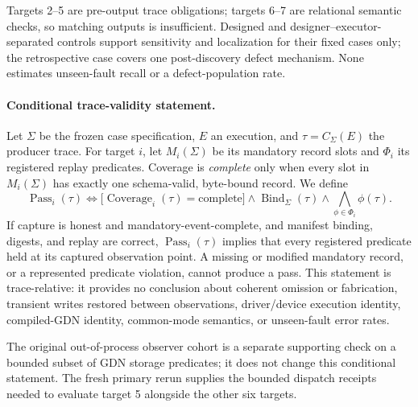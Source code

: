 \documentclass{article}
\begin{document}
Targets 2--5 are pre-output trace obligations; targets 6--7 are relational
semantic checks, so matching outputs is insufficient.  Designed and
designer--executor-separated controls support sensitivity and localization for
their fixed cases only; the retrospective case covers one post-discovery defect
mechanism.  None estimates unseen-fault recall or a defect-population rate.

\paragraph{Conditional trace-validity statement.}
Let $\Sigma$ be the frozen case specification, $E$ an execution, and
$\tau=C_{\Sigma}(E)$ the producer trace.  For target $i$, let
$M_i(\Sigma)$ be its mandatory record slots and $\Phi_i$ its registered replay
predicates.  Coverage is \emph{complete} only when every slot in
$M_i(\Sigma)$ has exactly one schema-valid, byte-bound record.  We define
\begin{equation}
  \operatorname{Pass}_i(\tau) \Longleftrightarrow
  \bigl[\operatorname{Coverage}_i(\tau)=\mathrm{complete}\bigr]
  \wedge \operatorname{Bind}_{\Sigma}(\tau)
  \wedge \bigwedge_{\phi\in\Phi_i}\phi(\tau).
\end{equation}
If capture is honest and mandatory-event-complete, and manifest binding,
digests, and replay are correct, $\operatorname{Pass}_i(\tau)$ implies that
every registered predicate held at its captured observation point.  A missing
or modified mandatory record, or a represented predicate violation, cannot
produce a pass.  This statement is trace-relative: it provides no conclusion
about coherent omission or fabrication, transient writes restored between
observations, driver/device execution identity, compiled-GDN identity,
common-mode semantics, or unseen-fault error rates.

The original out-of-process observer cohort is a separate supporting check on a
bounded subset of GDN storage predicates; it does not change this conditional
statement.  The fresh primary rerun supplies the bounded dispatch receipts
needed to evaluate target 5 alongside the other six targets.
\end{document}
